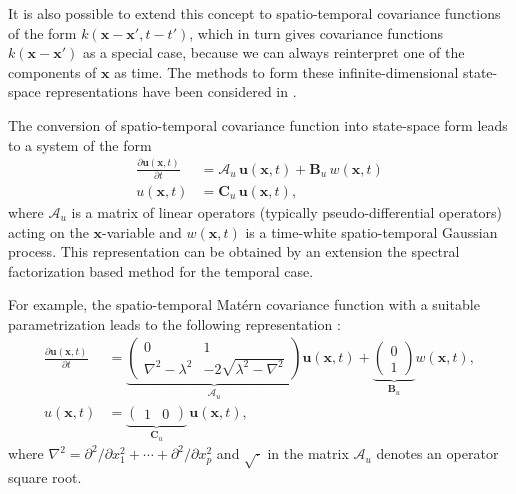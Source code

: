 \documentclass[journal]{IEEEtran}
\begin{document}
It is also possible to extend this concept to spatio-temporal covariance functions of the form $k(\mathbf{x} - \mathbf{x}', t-t')$, which in turn gives covariance functions $k(\mathbf{x} - \mathbf{x}')$ as a special case, because we can always reinterpret one of the components of $\mathbf{x}$ as time. The methods to form these infinite-dimensional state-space representations have been considered in \cite{Sarkka+Hartikainen:2012,Sarkka+Solin+Hartikainen:2013}. 

The conversion of spatio-temporal covariance function into state-space form leads to a system of the form
%
\begin{equation}
\begin{split}
  \frac{\partial\mathbf{u}(\mathbf{x},t)}{\partial t} &= \mathbf{\mathcal{A}}_u \, \mathbf{u}(\mathbf{x},t)
  + \mathbf{B}_u \, w(\mathbf{x},t) \\
   u(\mathbf{x},t) &= \mathbf{C}_u \, \mathbf{u}(\mathbf{x},t),
\end{split}
\label{eq:ssu2}
\end{equation}
%
where $\mathbf{\mathcal{A}}_u$ is a matrix of linear operators (typically pseudo-differential operators) acting on the $\mathbf{x}$-variable and $w(\mathbf{x},t)$ is a time-white spatio-temporal Gaussian process. This representation can be obtained by an extension the spectral factorization based method for the temporal case. 

For example, the spatio-temporal Mat\'ern covariance function with a suitable parametrization leads to the following representation \cite{Sarkka+Solin+Hartikainen:2013}:
%
\begin{equation}
\begin{split}
  \frac{\partial \mathbf{u}(\mathbf{x},t)}{\partial t} &= 
       \underbrace{\begin{pmatrix} 
        0 & 1 \\ 
        \nabla^2-\lambda^2
        & -2 \sqrt{\lambda^2-\nabla^2} 
      \end{pmatrix}}_{\mathbf{\mathcal{A}}_u} \mathbf{u}(\mathbf{x},t)
      + \underbrace{\begin{pmatrix} 0 \\ 1 \end{pmatrix}}_{\mathbf{B}_u} w(\mathbf{x},t), \\
      u(\mathbf{x},t) &= \underbrace{\begin{pmatrix} 1 & 0 \end{pmatrix}}_{\mathbf{C}_u} \, \mathbf{u}(\mathbf{x},t),
\end{split}
\label{2dmatern_ss}
\end{equation}
%
where $\nabla^2 = \partial^2 / \partial x_1^2 + \cdots + \partial^2 / \partial x_p^2$ and $\sqrt{\cdot}$ in the matrix $\mathbf{\mathcal{A}}_u$ denotes an operator square root.
\end{document}
